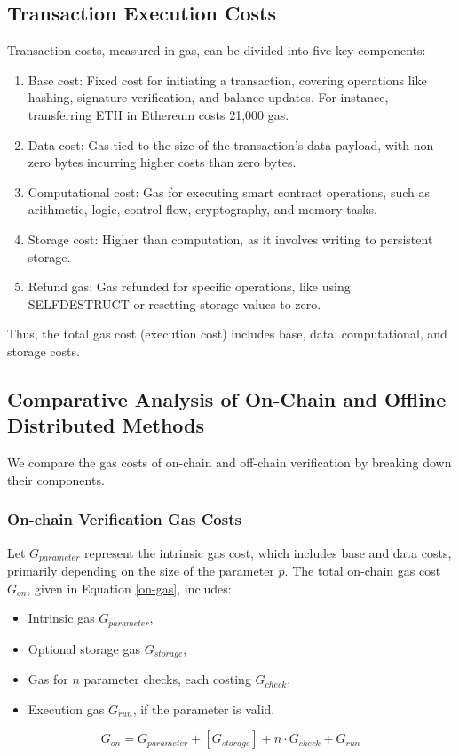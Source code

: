 \documentclass[runningheads]{llncs}
\begin{document}
\subsection{Transaction Execution Costs}
Transaction costs, measured in gas, can be divided into five key components:
\begin{enumerate}
\item Base cost: Fixed cost for initiating a transaction, covering operations like hashing, signature verification, and balance updates. For instance, transferring ETH in Ethereum costs 21,000 gas.
\item Data cost: Gas tied to the size of the transaction’s data payload, with non-zero bytes incurring higher costs than zero bytes.
\item Computational cost: Gas for executing smart contract operations, such as arithmetic, logic, control flow, cryptography, and memory tasks.
\item Storage cost: Higher than computation, as it involves writing to persistent storage. %
\item Refund gas: Gas refunded for specific operations, like using SELFDESTRUCT or resetting storage values to zero.
\end{enumerate}
Thus, the total gas cost (execution cost) includes base, data, computational, and storage costs.
\subsection{Comparative Analysis of On-Chain and Offline Distributed Methods}
We compare the gas costs of on-chain and off-chain verification by breaking down their components.
\subsubsection{On-chain Verification Gas Costs}
Let \( G_{parameter} \) represent the intrinsic gas cost, which includes base and data costs, primarily depending on the size of the parameter \( p \). The total on-chain gas cost \( G_{on} \), given in Equation \ref{on-gas}, includes:
\begin{itemize}
    \item Intrinsic gas \( G_{parameter} \),
    \item Optional storage gas \( G_{storage} \),
    \item Gas for \( n \) parameter checks, each costing \( G_{check} \),
    \item Execution gas \( G_{run} \), if the parameter is valid.
\end{itemize}
\begin{equation}
\label{on-gas}
G_{on} = G_{parameter} + [G_{storage}] + n \cdot G_{check} + G_{run}
\end{equation}
\end{document}

